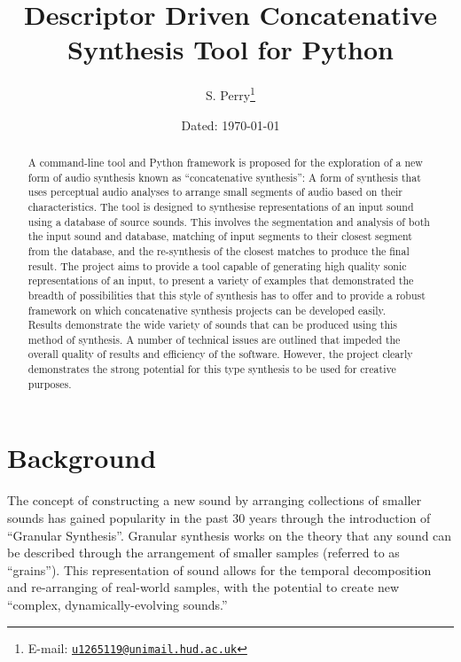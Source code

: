 \documentclass[titlepage]{scrartcl}
\begin{document}
    \title{Descriptor Driven Concatenative Synthesis Tool for Python}
    \author{S. Perry\thanks{E-mail: \texttt{\href{mailto:u1265119@unimail.hud.ac.uk}{u1265119@unimail.hud.ac.uk}}}}
    \date{Dated: \today}

    \maketitle

    \begin{abstract} 
    A command-line tool and Python framework is proposed for the exploration of
    a new form of audio synthesis known as ``concatenative synthesis'': A form
    of synthesis that uses perceptual audio analyses to arrange small segments
    of audio based on their characteristics.  The tool is designed to
    synthesise representations of an input sound using a database of source
    sounds. This involves the segmentation and analysis of both the input sound
    and database, matching of input segments to their closest segment from the
    database, and the re-synthesis of the closest matches to produce the final
    result. The  project aims to provide a tool capable of generating high
    quality sonic representations of an input, to present a variety of examples
    that demonstrated the breadth of possibilities that this style of synthesis
    has to offer and to provide a robust framework on which concatenative
    synthesis projects can be developed easily.\\

    Results demonstrate the wide variety of sounds that can be produced using
    this method of synthesis. A number of technical issues are outlined that
    impeded the overall quality of results and efficiency of the software.
    However, the project clearly demonstrates the strong potential for this
    type synthesis to be used for creative purposes.
    \end{abstract}

    \section*{Background}
    The concept of constructing a new sound by arranging collections of smaller
    sounds has gained popularity in the past 30 years through the introduction
    of ``Granular Synthesis''. Granular synthesis works on the theory that any
    sound can be described through the arrangement of smaller samples (referred
    to as ``grains''). This representation of sound allows for the temporal
    decomposition and re-arranging of real-world samples, with the potential to
    create new ``complex, dynamically-evolving
    sounds.''~\parencite[p.1]{Roads1988}\\
\end{document}
